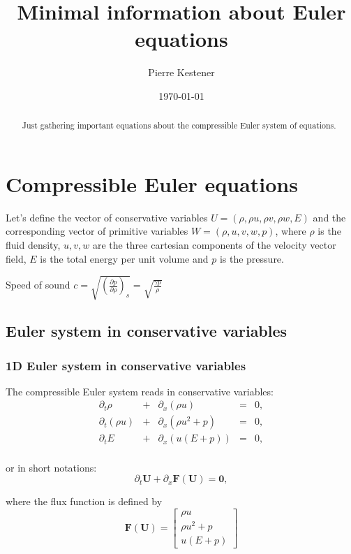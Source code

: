 \documentclass{article}
\title{Minimal information about Euler equations}
\author{Pierre Kestener}
\date{\today}
\begin{document}
\maketitle

\begin{abstract}
Just gathering important equations about the compressible Euler system of equations.
\end{abstract}

\section{Compressible Euler equations}

Let's define the vector of conservative variables $U=(\rho, \rho u, \rho v, \rho w, E)$ and the corresponding vector of primitive variables $W=(\rho, u, v, w, p)$, where $\rho$ is the fluid density, $u,v,w$ are the three cartesian components of the velocity vector field, $E$ is the total energy per unit volume and $p$ is the pressure.

Speed of sound $c=\sqrt{\left(\frac{\partial p}{\partial \rho}\right)_s} = \sqrt{\frac{\gamma p}{\rho}}$

\subsection{Euler system in conservative variables}

\subsubsection*{1D Euler system in conservative variables}
The compressible Euler system reads in conservative variables:\\
\begin{equation}
  \begin{array}{ccccc}
    \partial_t \rho & + & \partial_x(\rho u) & = & 0,\\
    \partial_t (\rho u) & + & \partial_x(\rho u^2+p) & = & 0,\\
    \partial_t E & + & \partial_x (u(E+p)) & = & 0,\\
  \end{array}
\end{equation}

or in short notations:
\begin{equation*}
  \partial_t \mathbf{U} + \partial_x \mathbf{F(U)} = \mathbf{0},
\end{equation*}

where the flux function is defined by
\begin{equation}
  \mathbf{F(U)} = \left [
  \begin{array}{c}
    \rho u \\
    \rho u^2 + p \\
    u (E + p)
  \end{array} \right]
\end{equation}
\end{document}
